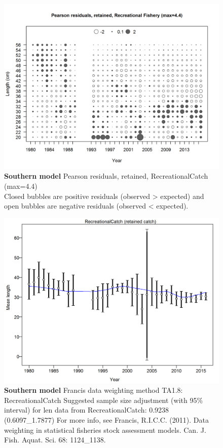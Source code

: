 \documentclass[12pt,]{article}
\begin{document}
\begin{figure}[htbp]
\centering
\includegraphics{./r4ss/plots_mod2/comp_lenfit_residsflt1mkt2.png}
\caption{\textbf{Southern model} Pearson residuals, retained,
RecreationalCatch (max=4.4)\\
Closed bubbles are positive residuals (observed \textgreater{} expected)
and open bubbles are negative residuals (observed \textless{} expected).
\label{fig:mod2_2_comp_lenfit_residsflt1mkt2}}
\end{figure}

\begin{figure}[htbp]
\centering
\includegraphics{./r4ss/plots_mod2/comp_lenfit_data_weighting_TA1.8_RecreationalCatch.png}
\caption{\textbf{Southern model} Francis data weighting method TA1.8:
RecreationalCatch Suggested sample size adjustment (with 95\% interval)
for len data from RecreationalCatch: 0.9238 (0.6097\_1.7877) For more
info, see Francis, R.I.C.C. (2011). Data weighting in statistical
fisheries stock assessment models. Can. J. Fish. Aquat. Sci. 68:
1124\_1138.
\label{fig:mod2_4_comp_lenfit_data_weighting_TA1.8_RecreationalCatch}}
\end{figure}
\end{document}
